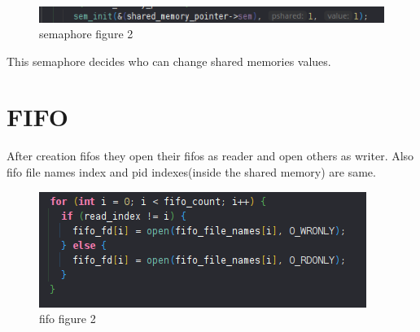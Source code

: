 \documentclass{article}
\begin{document}
\begin{figure}[htbp!]  
    \centering
    \includegraphics[scale=1]{sem2.png}
    \caption{semaphore figure 2}
    \label{fig:semaphore2}
\end{figure}
This semaphore decides who can change shared memories values.
\pagebreak

\section{FIFO}
After creation fifos they open their fifos as reader and open others as writer. Also fifo file names index and pid indexes(inside the shared memory) are same.
\begin{figure}[htbp!]  
    \centering
    \includegraphics[scale=1]{fifo-open.png}
    \caption{fifo figure 2}
    \label{fig:fifo}
\end{figure}
\end{document}
